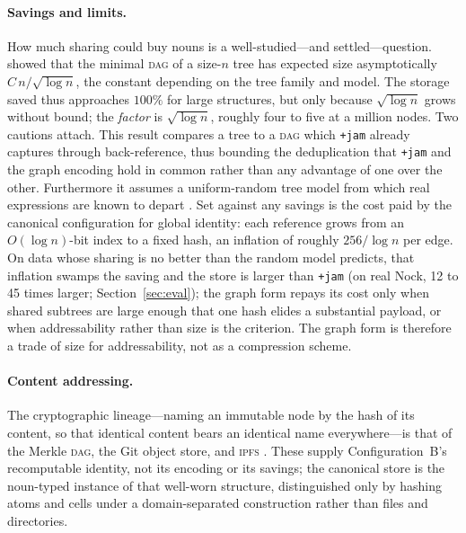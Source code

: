 \documentclass[twoside]{article}
\begin{document}
\paragraph*{Savings and limits.}  How much sharing could buy nouns is a well-studied---and settled---question.  \citet{Flajolet1990} showed that the minimal \textsc{dag} of a size-$n$ tree has expected size asymptotically $C\,n/\sqrt{\log n}$, the constant depending on the tree family and model.  The storage saved thus approaches $100\%$ for large structures, but only because $\sqrt{\log n}$ grows without bound; the \emph{factor} is $\sqrt{\log n}$, roughly four to five at a million nodes.  Two cautions attach.  This result compares a tree to a \textsc{dag} which \texttt{+jam} already captures through back-reference, thus bounding the deduplication that \texttt{+jam} and the graph encoding hold in common rather than any advantage of one over the other.  Furthermore it assumes a uniform-random tree model from which real expressions are known to depart \citep{Chitil1998}.  Set against any savings is the cost paid by the canonical configuration for global identity:  each reference grows from an $O(\log n)$-bit index to a fixed hash, an inflation of roughly $256/\log n$ per edge.  On data whose sharing is no better than the random model predicts, that inflation swamps the saving and the store is larger than \texttt{+jam} (on real Nock, 12 to 45 times larger; Section~\ref{sec:eval}); the graph form repays its cost only when shared subtrees are large enough that one hash elides a substantial payload, or when addressability rather than size is the criterion.  The graph form is therefore a trade of size for addressability, not as a compression scheme.

\paragraph*{Content addressing.}  The cryptographic lineage---naming an immutable node by the hash of its content, so that identical content bears an identical name everywhere---is that of the Merkle \textsc{dag}, the Git object store, and \textsc{ipfs} \citep{Benet2014}.  These supply Configuration~B's recomputable identity, not its encoding or its savings; the canonical store is the noun-typed instance of that well-worn structure, distinguished only by hashing atoms and cells under a domain-separated construction rather than files and directories.  \tombstone

\printbibliography
\end{document}
